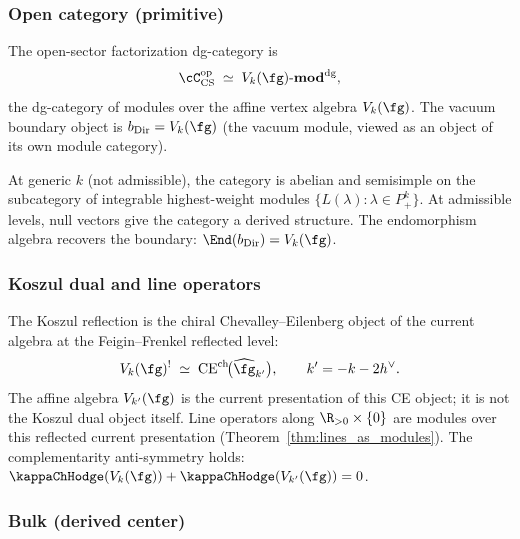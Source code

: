 \subsubsection*{Open category (primitive)}

\begin{definition}
\label{def:cs-open-category}
The open-sector factorization dg-category is
\begin{equation}\label{eq:cs-open-category}
\cC_{\mathrm{CS}}^{\mathrm{op}}
\;\simeq\;
V_k(\fg)\text{-}\mathbf{mod}^{\mathrm{dg}},
\end{equation}
the dg-category of modules over the affine vertex algebra
$V_k(\fg)$.
The vacuum boundary object is
$b_{\mathrm{Dir}} = V_k(\fg)$
(the vacuum module, viewed as an object of its own module
category).
\end{definition}

At generic $k$ (not admissible), the category is abelian and semisimple on the subcategory of integrable highest-weight modules $\{L(\lambda) : \lambda \in P_+^k\}$. At admissible levels, null vectors give the category a derived structure. The endomorphism algebra recovers the boundary: $\End(b_{\mathrm{Dir}}) = V_k(\fg)$.

\subsubsection*{Koszul dual and line operators}

The Koszul reflection is the chiral Chevalley--Eilenberg object of the
current algebra at the Feigin--Frenkel reflected level:
\begin{equation}\label{eq:cs-koszul-dual}
V_k(\fg)^!
\;\simeq\;
\operatorname{CE}^{\mathrm{ch}}\!\bigl(\widehat{\fg}_{k'}\bigr),
\qquad
k' = -k - 2h^\vee.
\end{equation}
The affine algebra $V_{k'}(\fg)$ is the current presentation of this
CE object; it is not the Koszul dual object itself.  Line operators
along $\R_{>0} \times \{0\}$ are modules over this reflected current
presentation
(Theorem~\ref{thm:lines_as_modules}).
The complementarity anti-symmetry holds:
$\kappaChHodge(V_k(\fg)) + \kappaChHodge(V_{k'}(\fg)) = 0$.

\subsubsection*{Bulk (derived center)}

